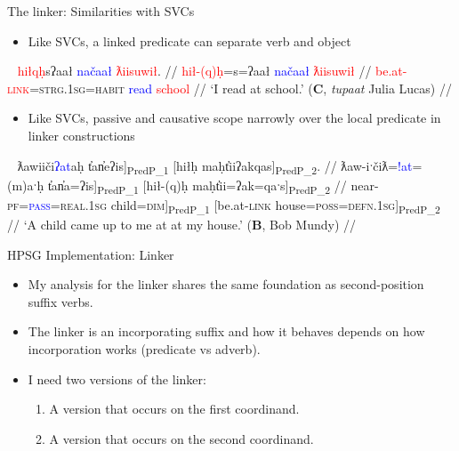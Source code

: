 \begin{frame}{The linker: Similarities with SVCs}

\begin{itemize}
\item Like SVCs, a linked predicate can separate verb and object	
\end{itemize}

\ex[exno=30]~
\begingl
\glpreamble \textcolor{red}{hiłqḥ}sʔaał \textcolor{blue}{načaał} \textcolor{red}{ƛiisuwił}. //
\gla \textcolor{red}{hił-(q)ḥ}=s=ʔaał \textcolor{blue}{načaał} \textcolor{red}{ƛiisuwił} //
\glb \textcolor{red}{be.at-\textsc{link}}=\textsc{strg.1sg}=\textsc{habit} \textcolor{blue}{read} \textcolor{red}{school} //
\glft `I read at school.' (\textbf{C}, \textit{tupaat} Julia Lucas) //
\endgl \label{ex:readatschool}
\xe

\pause

\begin{itemize}
\item Like SVCs, passive and causative scope narrowly over the local predicate in linker constructions	
\end{itemize}

\ex[exno=31]~
\begingl
\glpreamble {[}ƛawiiči\textcolor{blue}{ʔat}aḥ t̓an̓eʔis{]\textsubscript{PredP\_1}} {[}hiłḥ maḥt̓iiʔakqas{]\textsubscript{PredP\_2}}. //
\gla {[}ƛaw-iˑčiƛ=\textcolor{blue}{!at}=(m)aˑḥ t̓an̓a=ʔis{]\textsubscript{PredP\_1}} {[}hił-(q)ḥ maḥt̓ii=ʔak=qaˑs{]\textsubscript{PredP\_2}} //
\glb {[}near-\textsc{pf}=\textcolor{blue}{\textsc{pass}}=\textsc{real.1sg} child=\textsc{dim}{]\textsubscript{PredP\_1}} {[}be.at-\textsc{link} house=\textsc{poss}=\textsc{defn.1sg}{]\textsubscript{PredP\_2}} //
\glft `A child came up to me at at my house.' (\textbf{B}, Bob Mundy) //
\endgl \label{ex:approachedat}
\xe

\end{frame}


\begin{frame}{HPSG Implementation: Linker}
\begin{itemize}
\item My analysis for the linker shares the same foundation as second-position suffix verbs.
\item The linker is an incorporating suffix and how it behaves depends on how incorporation works (predicate vs adverb).
\item I need two versions of the linker:
\begin{enumerate}
\item A version that occurs on the first coordinand.
\item A version that occurs on the second coordinand.
\end{enumerate}
\end{itemize}
\end{frame}

